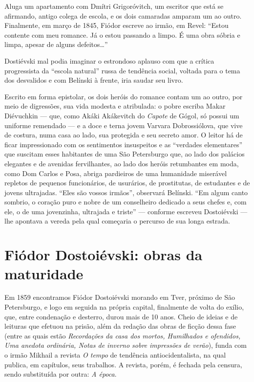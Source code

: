 Aluga um apartamento com Dmítri Grigoróvitch, um escritor que
está se afirmando, antigo colega de escola, e os dois camaradas
amparam um ao outro. Finalmente, em março de 1845, Fiódor escreve ao irmão, em
Revel: ``Estou contente com meu romance. Já o estou passando a limpo.
É uma obra sóbria e limpa, apesar de alguns defeitos\ldots{}''

Dostiévski mal podia imaginar o estrondoso aplauso com que a
crítica progressista da ``escola natural'' russa de tendência
social, voltada para o tema dos desvalidos e com Belínski à
frente, iria saudar seu livro.

Escrito em forma epistolar, os dois heróis do romance contam um
ao outro, por meio de digressões, sua vida modesta e atribulada:
o pobre escriba Makar Diévuchkin --- que, como Akáki Akákevitch do
\emph{Capote} de Gógol, só possui um uniforme remendado --- e a
doce e terna jovem Varvara Dobrossiólova, que vive de costura,
numa casa ao lado, sua protegida e seu secreto amor. O
leitor há de ficar impressionado com os sentimentos insuspeitos
e as ``verdades elementares'' que suscitam esses habitantes de
uma São Petersburgo que, ao lado dos palácios elegantes e de
avenidas fervilhantes, ao lado dos heróis retumbantes em moda,
como Dom Carlos e Posa, abriga pardieiros de uma humanidade
miserável repletos de pequenos funcionários, de usurários, de
prostitutas, de estudantes e de jovens ultrajadas. ``Eles são
vossos irmãos'', observará Belínski. ``Em algum canto sombrio,
o coração puro e nobre de um conselheiro dedicado a seus chefes
e, com ele, o de uma jovenzinha, ultrajada e triste'' ---
conforme escreveu Dostoiévski --- lhe apontava a vereda pela
qual começaria o percurso de sua longa estrada.


\section{\uppercase{F}iódor \uppercase{D}ostoiévski: obras da maturidade}


Em 1859 encontramos Fiódor Dostoiévski morando em Tver, próximo
de São Petersburgo, e logo em seguida na própria capital,
finalmente de volta do exílio, que, entre condenação e desterro,
durou mais de 10 anos. Cheio de ideias e de leituras que efetuou
na prisão, além da redação das obras de ficção dessa fase (entre
as quais estão \emph{Recordações da casa dos mortos, Humilhados
e ofendidos, Uma anedota ordinária, Notas de inverno sobre
impressões de verão}), funda com o irmão Mikhail a revista
\emph{O tempo} de tendência antiocidentalista, na qual publica,
em capítulos, seus trabalhos. A revista, porém, é fechada pela
censura, sendo substituída por outra: \emph{A época}.


